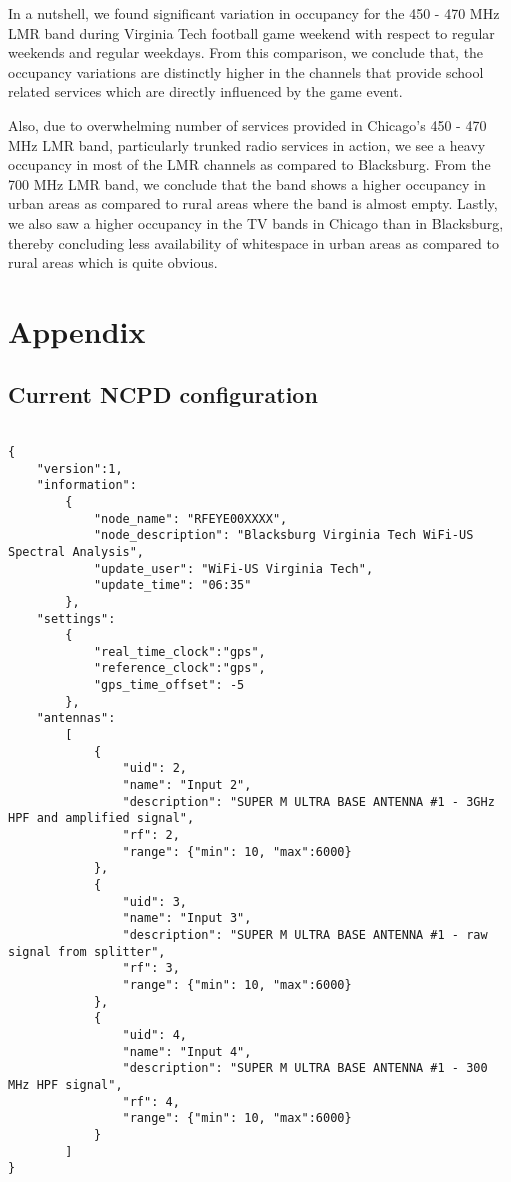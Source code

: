 \documentclass[12pt,sts]{report}
\begin{document}
In a nutshell, we found significant variation in occupancy for the 450 - 470 MHz LMR band during Virginia Tech football game weekend with respect to regular weekends and regular weekdays. From this comparison, we conclude that, the occupancy variations are distinctly higher in the channels that provide school related services which are directly influenced by the game event.

Also, due to overwhelming number of services provided in Chicago's 450 - 470 MHz LMR band, particularly trunked radio services in action, we see a heavy occupancy in most of the LMR channels as compared to Blacksburg. From the 700 MHz LMR band, we conclude that the band shows a higher occupancy in urban areas as compared to rural areas where the band is almost empty. Lastly, we also saw a higher occupancy in the TV bands in Chicago than in Blacksburg, thereby concluding less availability of whitespace in urban areas as compared to rural areas which is quite obvious.

\pagebreak
\section*{Appendix}

\subsection*{Current NCPD configuration}

\begin{lstlisting}

{
	"version":1,
	"information":
		{
			"node_name": "RFEYE00XXXX",
			"node_description": "Blacksburg Virginia Tech WiFi-US Spectral Analysis",
			"update_user": "WiFi-US Virginia Tech",
			"update_time": "06:35"
		},
	"settings":
		{
			"real_time_clock":"gps",
			"reference_clock":"gps",
			"gps_time_offset": -5
		},
	"antennas":
		[
			{
				"uid": 2,
				"name": "Input 2",
				"description": "SUPER M ULTRA BASE ANTENNA #1 - 3GHz HPF and amplified signal",
				"rf": 2,
				"range": {"min": 10, "max":6000}
			},
			{
				"uid": 3,
				"name": "Input 3",
				"description": "SUPER M ULTRA BASE ANTENNA #1 - raw signal from splitter",
				"rf": 3,
				"range": {"min": 10, "max":6000}
			},
			{
				"uid": 4,
				"name": "Input 4",
				"description": "SUPER M ULTRA BASE ANTENNA #1 - 300 MHz HPF signal",
				"rf": 4,
				"range": {"min": 10, "max":6000}
			}
		]
}

\end{lstlisting}
\end{document}
